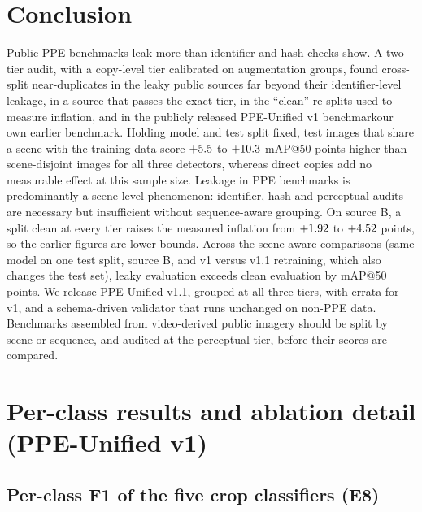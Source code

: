 \documentclass[review,12pt]{elsarticle}
\newcommand{\anonor}[2]{\ifdefined\ANON#1\else#2\fi}
\begin{document}
\section{Conclusion}
\label{sec:conclusion}
Public PPE benchmarks leak more than identifier and hash checks show.
A two-tier audit, with a copy-level tier calibrated on augmentation
groups, found cross-split near-duplicates in the leaky public sources
far beyond their identifier-level leakage, in a source that passes the
exact tier, in the ``clean'' re-splits used to measure inflation, and
in \anonor{the publicly released PPE-Unified v1 benchmark}{our own earlier benchmark}. Holding model and test split fixed, test
images that share a scene with the training data score
$+5.5$ to $+10.3$ mAP@50 points higher than
scene-disjoint images for all three detectors, whereas direct copies
add no measurable effect at this sample size. Leakage in PPE
benchmarks is predominantly a scene-level phenomenon: identifier, hash
and perceptual audits are necessary but insufficient without
sequence-aware grouping. On source B, a split clean at every tier
raises the measured inflation from $+1.92$ to
$+4.52$ points, so the earlier figures are lower bounds.
Across the scene-aware comparisons (same model on one test split,
source B, and v1 versus v1.1 retraining, which also changes the test
set), leaky evaluation exceeds clean evaluation by \ninflRange{}
mAP@50 points. We release PPE-Unified v1.1, grouped at all three tiers, with
errata for v1, and a schema-driven validator that runs unchanged on
non-PPE data. Benchmarks assembled from video-derived public imagery
should be split by scene or sequence, and audited at the perceptual
tier, before their scores are compared.

\appendix
\setcounter{table}{0}
\section{Per-class results and ablation detail (PPE-Unified v1)}
\label{app:detail}

\subsection{Per-class F1 of the five crop classifiers (E8)}
\label{app:perclass}

\begin{table}[htbp]\centering
\caption{Per-class F1 on ground-truth test crops of v1 (E8). Support =
number of test crops.}
\label{tab:f1all}
\footnotesize
\setlength{\tabcolsep}{4pt}

\end{table}
\end{document}
